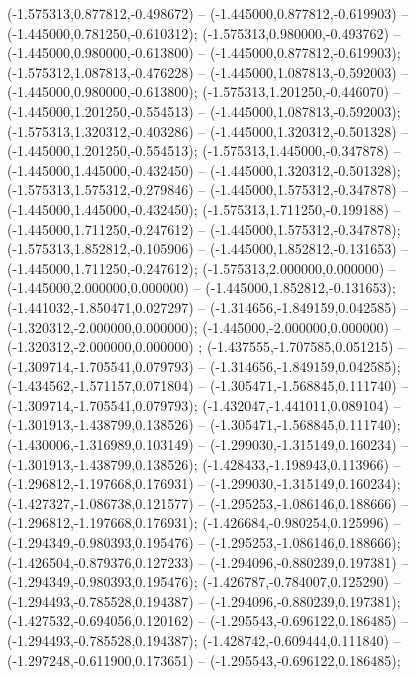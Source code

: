  (-1.575313,0.877812,-0.498672) -- (-1.445000,0.877812,-0.619903) -- (-1.445000,0.781250,-0.610312);
 (-1.575313,0.980000,-0.493762) -- (-1.445000,0.980000,-0.613800) -- (-1.445000,0.877812,-0.619903);
 (-1.575312,1.087813,-0.476228) -- (-1.445000,1.087813,-0.592003) -- (-1.445000,0.980000,-0.613800);
 (-1.575313,1.201250,-0.446070) -- (-1.445000,1.201250,-0.554513) -- (-1.445000,1.087813,-0.592003);
 (-1.575313,1.320312,-0.403286) -- (-1.445000,1.320312,-0.501328) -- (-1.445000,1.201250,-0.554513);
 (-1.575313,1.445000,-0.347878) -- (-1.445000,1.445000,-0.432450) -- (-1.445000,1.320312,-0.501328);
 (-1.575313,1.575312,-0.279846) -- (-1.445000,1.575312,-0.347878) -- (-1.445000,1.445000,-0.432450);
 (-1.575313,1.711250,-0.199188) -- (-1.445000,1.711250,-0.247612) -- (-1.445000,1.575312,-0.347878);
 (-1.575313,1.852812,-0.105906) -- (-1.445000,1.852812,-0.131653) -- (-1.445000,1.711250,-0.247612);
 (-1.575313,2.000000,0.000000) -- (-1.445000,2.000000,0.000000) -- (-1.445000,1.852812,-0.131653);
 (-1.441032,-1.850471,0.027297) -- (-1.314656,-1.849159,0.042585) -- (-1.320312,-2.000000,0.000000);
 (-1.445000,-2.000000,0.000000) -- (-1.320312,-2.000000,0.000000) ;
 (-1.437555,-1.707585,0.051215) -- (-1.309714,-1.705541,0.079793) -- (-1.314656,-1.849159,0.042585);
 (-1.434562,-1.571157,0.071804) -- (-1.305471,-1.568845,0.111740) -- (-1.309714,-1.705541,0.079793);
 (-1.432047,-1.441011,0.089104) -- (-1.301913,-1.438799,0.138526) -- (-1.305471,-1.568845,0.111740);
 (-1.430006,-1.316989,0.103149) -- (-1.299030,-1.315149,0.160234) -- (-1.301913,-1.438799,0.138526);
 (-1.428433,-1.198943,0.113966) -- (-1.296812,-1.197668,0.176931) -- (-1.299030,-1.315149,0.160234);
 (-1.427327,-1.086738,0.121577) -- (-1.295253,-1.086146,0.188666) -- (-1.296812,-1.197668,0.176931);
 (-1.426684,-0.980254,0.125996) -- (-1.294349,-0.980393,0.195476) -- (-1.295253,-1.086146,0.188666);
 (-1.426504,-0.879376,0.127233) -- (-1.294096,-0.880239,0.197381) -- (-1.294349,-0.980393,0.195476);
 (-1.426787,-0.784007,0.125290) -- (-1.294493,-0.785528,0.194387) -- (-1.294096,-0.880239,0.197381);
 (-1.427532,-0.694056,0.120162) -- (-1.295543,-0.696122,0.186485) -- (-1.294493,-0.785528,0.194387);
 (-1.428742,-0.609444,0.111840) -- (-1.297248,-0.611900,0.173651) -- (-1.295543,-0.696122,0.186485);
